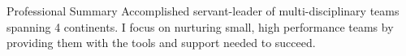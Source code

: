 \documentclass{resume} %
\begin{document}
\vspace{1em}

\begin{rSection}{Professional Summary}
Accomplished servant-leader of multi-disciplinary teams spanning 4
continents. I focus on nurturing small, high performance teams by
providing them with the tools and support needed to succeed.
\end{rSection}

\end{document}
